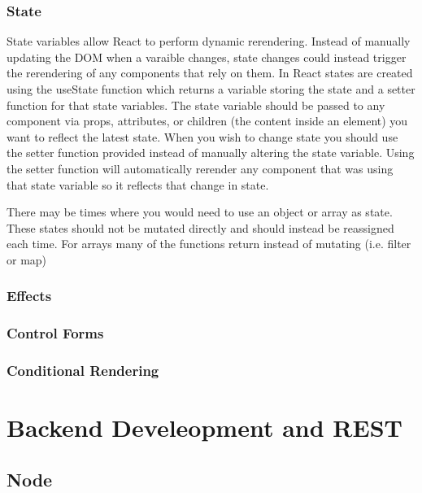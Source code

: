 \documentclass{article}[12pt]
\begin{document}
    \subsubsection{State}
    State variables allow React to perform dynamic rerendering. Instead of manually updating the DOM when a varaible changes, state changes could instead trigger the rerendering of any components that rely on them. In React states are created using the useState function which returns a variable storing the state and a setter function for that state variables. The state variable should be passed to any component via props, attributes, or children (the content inside an element) you want to reflect the latest state. When you wish to change state you should use the setter function provided instead of manually altering the state variable. Using the setter function will automatically rerender any component that was using that state variable so it reflects that change in state.

    There may be times where you would need to use an object or array as state. These states should not be mutated directly and should instead be reassigned each time. For arrays many of the functions return instead of mutating (i.e. filter or map)

    \subsubsection{Effects}
    
    \subsubsection{Control Forms}
    
    \subsubsection{Conditional Rendering}
    

    \section{Backend Develeopment and REST}
    \subsection{Node}
\end{document}
